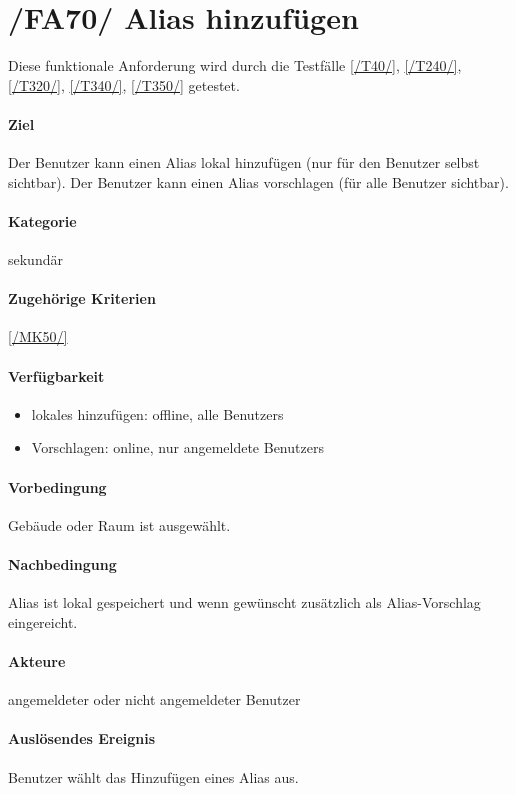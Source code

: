 \section[Alias hinzufügen]{/FA70/ Alias hinzufügen}
\label{/FA70/}
Diese funktionale Anforderung wird durch die Testfälle \ref{/T40/}, \ref{/T240/}, \ref{/T320/}, \ref{/T340/}, \ref{/T350/} getestet.
\paragraph{Ziel}
Der \Gls{Benutzer} kann einen \Gls{Alias} \gls{lokal} hinzufügen (nur für den \Gls{Benutzer} selbst sichtbar). Der \Gls{Benutzer} kann einen \Gls{Alias} vorschlagen (für alle \Gls{Benutzer} sichtbar).
\paragraph{Kategorie}
sekundär
\paragraph{Zugehörige Kriterien}
\ref{/MK50/}
\paragraph{Verfügbarkeit}
\begin{itemize}
    \item \Gls{lokal}es hinzufügen: \gls{offline}, alle \Glspl{Benutzer}
    \item Vorschlagen: online, nur angemeldete \Glspl{Benutzer}
\end{itemize}

\paragraph{Vorbedingung}
Gebäude oder Raum ist ausgewählt.
\paragraph{Nachbedingung}
\Gls{Alias} ist \gls{lokal} gespeichert und wenn gewünscht zusätzlich als \Gls{Alias-Vorschlag} eingereicht.
\paragraph{Akteure}
angemeldeter oder nicht angemeldeter \Gls{Benutzer}
\paragraph{Auslösendes Ereignis}
\Gls{Benutzer} wählt das Hinzufügen eines \Gls{Alias} aus.
